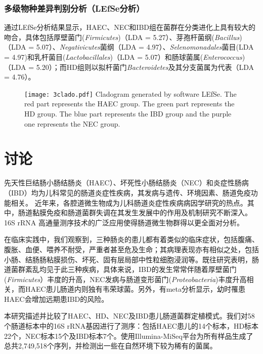 {{    \subsubsection{多级物种差异判别分析（LEfSe分析）}
    通过LEfSe分析结果显示，HAEC、NEC和IBD组在菌群在分类进化上具有较大的吻合，具体包括厚壁菌门(\textit{Firmicutes})（LDA = 5.27）、芽孢杆菌纲(\textit{Bacillus})（LDA = 5.07）、\textit{Negativicutes}菌纲（LDA = 4.97）、\textit{Selenomonadales}菌目(LDA = 4.97)和乳杆菌目(\textit{Lactobacillales})（LDA = 5.07）和肠球菌属(\textit{Enterococcus})（LDA = 5.20）；而HD组则以拟杆菌门\textit{Bacteroidetes}及其分支菌属为代表（LDA = 4.76）。
    \begin{figure}[!htp]
      \centering
      \texttt{[image: 3clado.pdf]}
        {Cladogram generated by software LEfSe. The red part represents the HAEC group. The green part represents the HD group. The blue part represents the IBD group and the purple one represents the NEC group. }
      \label{fig:3clado}
    \end{figure}
\section{讨论}
  先天性巨结肠小肠结肠炎（HAEC）、坏死性小肠结肠炎（NEC）和炎症性肠病（IBD）均为儿科常见的肠道炎症性疾病，其发病与遗传、环境因素、肠道免疫功能相关\cite{Downard2012Treatment, Santha2017Mucosal, Denning2016Pathogenesis}。 近年来，各腔道微生物成为儿科肠道炎症性疾病病因学研究的热点。其中，肠道黏膜免疫和肠道菌群失调在其发生发展中的作用及机制研究不断深入。16S rRNA 高通量测序技术的广泛应用使得肠道微生物群得以更全面对分析。

  在临床实践中，我们观察到，三种肠炎的患儿都有着类似的临床症状，包括腹痛、腹胀、血便、喂养不耐受，严重者甚至危及生命；其病理表现亦有相似之处，包括小肠、结肠肠粘膜损伤、坏死、固有层局部中性粒细胞浸润等。既往研究表明，肠道菌群紊乱均见于此三种疾病，具体来说，IBD的发生常常伴随着厚壁菌门(\textit{Firmicutes}）丰度的升高，NEC发病与肠道变形菌门(\textit{Proteobacteria})丰度升高相关\cite{Hosny2017Updating}，而HAEC患儿肠道内则独有韦荣球菌\cite{Yan2014Characterization,Li2016Characterization}。另外，有meta分析显示，幼时罹患HAEC会增加远期患IBD的风险\cite{Nakamura2017Inflammatory}。

  本研究描述并比较了HAEC、HD、NEC及IBD患儿肠道菌群定植模式。我们对58个肠道标本中的16S rRNA基因进行了测序：包括HAEC患儿的14个标本，HD标本22个，NEC标本15个及IBD标本7个。使用Illumina-MiSeq平台为所有样品生成了总共2,749,518个序列，并检测出一些在自然环境下较为稀有的菌属。

}}
